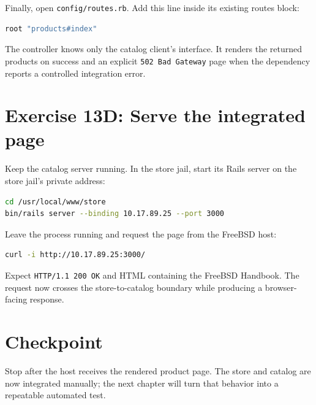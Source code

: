 Finally, open \texttt{config/routes.rb}. Add this line inside its existing
routes block:

\begin{lstlisting}[language=Ruby]
root "products#index"
\end{lstlisting}

The controller knows only the catalog client's interface. It renders the
returned products on success and an explicit \texttt{502 Bad Gateway} page
when the dependency reports a controlled integration error.

\section{Exercise 13D: Serve the integrated page}

Keep the catalog server running. In the store jail, start its Rails server on
the store jail's private address:

\begin{lstlisting}[language=sh]
cd /usr/local/www/store
bin/rails server --binding 10.17.89.25 --port 3000
\end{lstlisting}

Leave the process running and request the page from the FreeBSD host:

\begin{lstlisting}[language=sh]
curl -i http://10.17.89.25:3000/
\end{lstlisting}

Expect \texttt{HTTP/1.1 200 OK} and HTML containing the FreeBSD Handbook. The
request now crosses the store-to-catalog boundary while producing a
browser-facing response.

\section{Checkpoint}

Stop after the host receives the rendered product page. The store and catalog
are now integrated manually; the next chapter will turn that behavior into a
repeatable automated test.
